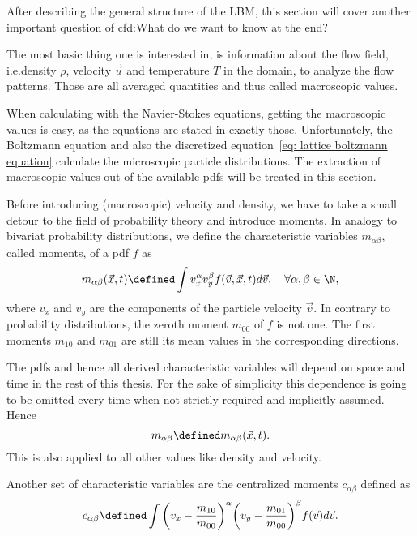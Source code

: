 After describing the general structure of the LBM, this section will cover another important question of \gls{cfd}:\@ What do we want to know at the end?

The most basic thing one is interested in, is information about the flow field, i.e.\@ density $\rho$, velocity $\vec{u}$ and temperature $T$ in the domain, to analyze the flow patterns.
Those are all averaged quantities and thus called macroscopic values.

When calculating with the Navier-Stokes equations, getting the macroscopic values is easy, as the equations are stated in exactly those.
Unfortunately, the Boltzmann equation and also the discretized equation~\eqref{eq: lattice boltzmann equation} calculate the microscopic particle distributions.
The extraction of macroscopic values out of the available \glspl{pdf} will be treated in this section.

Before introducing (macroscopic) velocity and density, we have to take a small detour to the field of probability theory and introduce moments.
In analogy to bivariat probability distributions, we define the characteristic variables $m_{\alpha\beta}$, called moments, of a \gls{pdf} $f$ as
\begin{equation}
  \label{eq: moments continuous}
  m_{\alpha\beta}(\vec{x},t) \defined  \int v_x^\alpha v_y^\beta f(\vec{v},\vec{x},t) d\vec{v},\quad\forall\alpha,\beta\in\N,
\end{equation}
where $v_x$ and $v_y$ are the components of the particle velocity $\vec{v}$.
In contrary to probability distributions, the zeroth moment $m_{00}$ of $f$ is not one.
The first moments $m_{10}$ and $m_{01}$ are still its mean values in the corresponding directions.

The \glspl{pdf} and hence all derived characteristic variables will depend on space and time in the rest of this thesis.
For the sake of simplicity this dependence is going to be omitted every time when not strictly required and implicitly assumed. Hence
\begin{equation}
  \label{eq: leave out x and y}
  m_{\alpha\beta} \defined m_{\alpha\beta}(\vec{x},t).
\end{equation}
This is also applied to all other values like density and velocity.

Another set of characteristic variables are the centralized moments $c_{\alpha\beta}$ defined as
\begin{equation}
  \label{eq: central moments continuous}
  c_{\alpha\beta} \defined \int {\left(v_x - \frac{m_{10}}{m_{00}}\right)}^\alpha {\left(v_y-\frac{m_{01}}{m_{00}}\right)}^\beta f(\vec{v})  d\vec{v}.
\end{equation}


